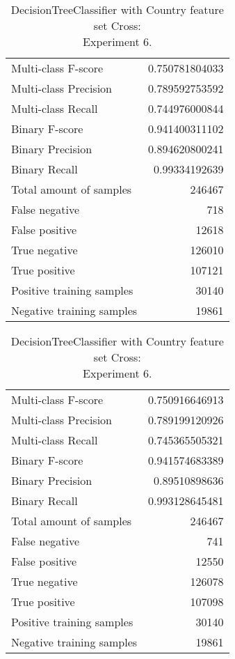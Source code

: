 \begin{table}[H]
\begin{minipage}{0.5\textwidth}
\caption{DecisionTreeClassifier with Country feature set Cross: \\Experiment 5.}
\centering
\begin{tabular}{l r}
\toprule
Multi-class F-score & 0.750781804033 \\
Multi-class Precision & 0.789592753592 \\
Multi-class Recall & 0.744976000844 \\
\midrule
Binary F-score & 0.941400311102 \\
Binary Precision & 0.894620800241 \\
Binary Recall & 0.99334192639 \\
\midrule
Total amount of samples & 246467 \\
False negative & 718 \\
False positive & 12618 \\
True negative & 126010 \\
True positive & 107121 \\
\midrule
Positive training samples & 30140 \\
Negative training samples & 19861 \\
\bottomrule
\end{tabular}
\end{minipage}
\hfillx
\begin{minipage}{0.5\textwidth}

\caption{DecisionTreeClassifier with Country feature set Cross: \\Experiment 6.}
\centering
\begin{tabular}{l r}
\toprule
Multi-class F-score & 0.750916646913 \\
Multi-class Precision & 0.789199120926 \\
Multi-class Recall & 0.745365505321 \\
\midrule
Binary F-score & 0.941574683389 \\
Binary Precision & 0.89510898636 \\
Binary Recall & 0.993128645481 \\
\midrule
Total amount of samples & 246467 \\
False negative & 741 \\
False positive & 12550 \\
True negative & 126078 \\
True positive & 107098 \\
\midrule
Positive training samples & 30140 \\
Negative training samples & 19861 \\
\bottomrule
\end{tabular}
\end{minipage}
\end{table}

